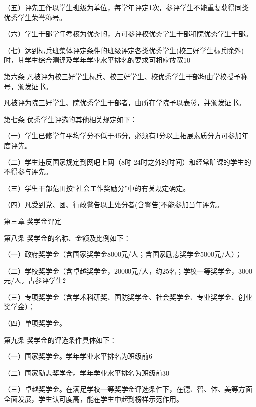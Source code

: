 \documentclass[UTF8,12pt,a4paper]{report}
\begin{document}
（五）评先工作以学生班级为单位，每学年评定1次，参评学生不能重复获得同类优秀学生荣誉称号。

（六）学生干部学年考核为优秀的，方可参评校优秀学生干部和院优秀学生干部。

（七）达到标兵班集体评定条件的班级评定各类优秀学生(校三好学生标兵除外)时，其学生综合测评及学年学业水平排名的要求可相应放宽10%

第六条  凡被评为校三好学生标兵、校三好学生、校优秀学生干部均由学校授予称号，颁发证书。

凡被评为院三好学生、院优秀学生干部者，由所在学院予以表彰，并颁发证书。

第七条  优秀学生评选的其他相关规定如下：

（一）学生已修学年平均学分不低于45分，必须有1分以上拓展素质分方可参加年度评先。

（二）学生违反国家规定到网吧上网（8时-24时之外的时间）和经常旷课的学生的不得参与评先。

（三）学生干部范围按“社会工作奖励分”中的有关规定确定。

（四）凡受到党、团、行政警告以上处分者(含警告)不能参加当年评先。



第三章  奖学金评定

第八条  奖学金的名称、金额及比例如下：

（一）政府奖学金（含国家奖学金8000元/人；含国家励志奖学金5000元/人）；

（二）学校奖学金（含卓越奖学金，20000元/人，约25名；学校一等奖学金，3000元/人，占参评学生2%

（三）专项奖学金（含学术科研奖、国防奖学金、社会奖学金、专业奖学金、创业奖学金）；

（四）单项奖学金。

第九条  奖学金的评选条件具体如下：

（一）国家奖学金。学年学业水平排名为班级前6%

（二）国家励志奖学金。学年学业水平排名为班级前30%

（三）卓越奖学金。在满足学校一等奖学金评选条件下，在德、智、体、美等方面全面发展，学生认可度高，能在学生中起到榜样示范作用。
\end{document}
